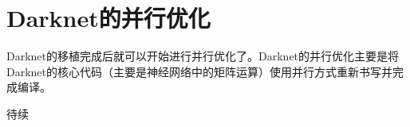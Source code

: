 \chapter{Darknet的并行优化}
Darknet的移植完成后就可以开始进行并行优化了。Darknet的并行优化主要是将Darknet的核心代码（主要是神经网络中的矩阵运算）使用并行方式重新书写并完成编译。

待续
